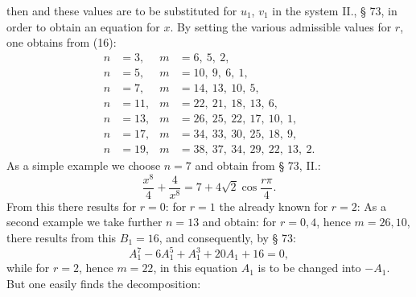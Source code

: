 then
and these values are to be substituted for $u_1$, $v_1$ in the system II., § 73,
in order to obtain an equation for $x$.
By setting the various admissible values for $r$, one obtains
from (16):
\[
\begin{aligned}
n &= 3, & m &= 6,\ 5,\ 2,\\
n &= 5, & m &= 10,\ 9,\ 6,\ 1,\\
n &= 7, & m &= 14,\ 13,\ 10,\ 5,\\
n &= 11, & m &= 22,\ 21,\ 18,\ 13,\ 6,\\
n &= 13, & m &= 26,\ 25,\ 22,\ 17,\ 10,\ 1,\\
n &= 17, & m &= 34,\ 33,\ 30,\ 25,\ 18,\ 9,\\
n &= 19, & m &= 38,\ 37,\ 34,\ 29,\ 22,\ 13,\ 2.
\end{aligned}
\]
As a simple example we choose $n = 7$ and obtain from
§ 73, II.:
\[ \frac{x^8}{4} + \frac{4}{x^8} = 7 + 4\sqrt2 \cos\frac{r\pi}{4}. \]
From this there results for $r = 0$:
for $r=1$ the already known
for $r=2$:
As a second example we take further $n = 13$ and obtain:
for $r = 0, 4$, hence $m = 26, 10$, there results from this $B_1 = 16$, and
consequently, by § 73:
\[ A_1^7 - 6A_1^5 + A_1^3 + 20A_1 + 16 = 0, \]
while for $r=2$, hence $m=22$, in this equation $A_1$ is to be changed into
$-A_1$.
But one easily finds the decomposition:
